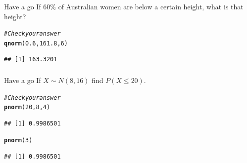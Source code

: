 \documentclass[t,xcolor=pdftex,dvipsnames,table]{beamer}\usepackage[]{graphicx}\usepackage[]{color}
\makeatletter
\newcommand{\hlnum}[1]{\textcolor[rgb]{0.686,0.059,0.569}{#1}}%
\newcommand{\hlcom}[1]{\textcolor[rgb]{0.678,0.584,0.686}{\textit{#1}}}%
\newcommand{\hlstd}[1]{\textcolor[rgb]{0.345,0.345,0.345}{#1}}%
\newcommand{\hlkwd}[1]{\textcolor[rgb]{0.737,0.353,0.396}{\textbf{#1}}}%
\newenvironment{kframe}{%
 \def\at@end@of@kframe{}%
 \ifinner\ifhmode%
  \def\at@end@of@kframe{\end{minipage}}%
  \begin{minipage}{\columnwidth}%
 \fi\fi%
 \def\FrameCommand##1{\hskip\@totalleftmargin \hskip-\fboxsep
 \colorbox{shadecolor}{##1}\hskip-\fboxsep
     \hskip-\linewidth \hskip-\@totalleftmargin \hskip\columnwidth}%
 \MakeFramed {\advance\hsize-\width
   \@totalleftmargin\z@ \linewidth\hsize
   \@setminipage}}%
 {\par\unskip\endMakeFramed%
 \at@end@of@kframe}
\newenvironment{knitrout}{}{} %
\makeatother
\begin{document}
\begin{frame}[fragile]\frametitle{}

\begin{alertblock}{Have a go}
If 60\% of Australian women are below a certain height, what is that height?
\end{alertblock}

\begin{knitrout}
\color{fgcolor}\begin{kframe}
\begin{alltt}
\hlcom{#Check your answer}
\hlkwd{qnorm}\hlstd{(}\hlnum{0.6}\hlstd{,}\hlnum{161.8}\hlstd{,}\hlnum{6}\hlstd{)}
\end{alltt}
\begin{verbatim}
## [1] 163.3201
\end{verbatim}
\end{kframe}
\end{knitrout}
\end{frame}

\begin{frame}[fragile]\frametitle{}

\begin{alertblock}{Have a go}
If $X \sim N(8,16)$ find $P(X \leq 20)$.

\end{alertblock}

\begin{knitrout}
\color{fgcolor}\begin{kframe}
\begin{alltt}
\hlcom{#Check your answer}
\hlkwd{pnorm}\hlstd{(}\hlnum{20}\hlstd{,}\hlnum{8}\hlstd{,}\hlnum{4}\hlstd{)}
\end{alltt}
\begin{verbatim}
## [1] 0.9986501
\end{verbatim}
\begin{alltt}
\hlkwd{pnorm}\hlstd{(}\hlnum{3}\hlstd{)}
\end{alltt}
\begin{verbatim}
## [1] 0.9986501
\end{verbatim}
\end{kframe}
\end{knitrout}

\end{frame}
\end{document}
